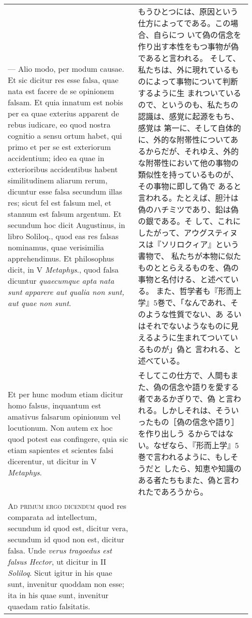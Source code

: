 \documentclass[paper=a4paper,fontsize=10pt,jafontsize=9pt,titlepage]{jlreq}
\begin{document}
\begin{longtable}{p{21em}p{21em}}
\\



--- Alio modo, per modum causae. Et sic dicitur res esse
falsa, quae nata est facere de se opinionem falsam. Et quia innatum est
nobis per ea quae exterius apparent de rebus iudicare, eo quod nostra
cognitio a sensu ortum habet, qui primo et per se est exteriorum
accidentium; ideo ea quae in exterioribus accidentibus habent
similitudinem aliarum rerum, dicuntur esse falsa secundum illas res;
sicut fel est falsum mel, et stannum est falsum argentum. Et secundum
hoc dicit Augustinus, in libro Soliloq., quod eas res falsas nominamus,
quae verisimilia apprehendimus. Et philosophus dicit, in V {\itshape
Metaphys}., quod falsa dicuntur {\itshape quaecumque apta nata sunt
apparere aut qualia non sunt, aut quae non sunt}. 

&

もうひとつには、原因という仕方によってである。この場合、自らにつ
 いて偽の信念を作り出す本性をもつ事物が偽であると言われる。
そして、私たちは、外に現れているものによって事物について判断するように生
 まれついているので、というのも、私たちの認識は、感覚に起源をもち、感覚は
 第一に、そして自体的に、外的な附帯性についてあるからだが、それゆえ、外的
 な附帯性において他の事物の類似性を持っているものが、その事物に即して偽で
 あると言われる。たとえば、胆汁は偽のハチミツであり、鉛は偽の銀である。そ
 して、これにしたがって、アウグスティヌスは『ソリロクィア』という書物で、
 私たちが本物に似たものととらえるものを、偽の事物と名付ける、と述べている。
 また、哲学者も『形而上学』5巻で、「なんであれ、そのような性質でない、あ
 るいはそれでないようなものに見えるように生まれてついているものが」偽と
 言われる、と述べている。

\\

Et per hunc modum
etiam dicitur homo falsus, inquantum est amativus falsarum opinionum vel
locutionum. Non autem ex hoc quod potest eas confingere, quia sic etiam
sapientes et scientes falsi dicerentur, ut dicitur in V {\itshape
Metaphys}.

&
そしてこの仕方で、人間もまた、偽の信念や語りを愛する者であるかぎりで、偽
 と言われる。しかしそれは、そういったもの［偽の信念や語り］を作り出しう
 るからではない。なぜなら、『形而上学』5巻で言われるように、もしそうだと
 したら、知恵や知識のある者たちもまた、偽と言われたであろうから。

\\


{\scshape Ad primum ergo dicendum} quod res comparata ad intellectum,
secundum id quod est, dicitur vera, secundum id quod non est, dicitur
falsa. Unde {\itshape verus tragoedus est falsus Hector}, ut dicitur in
II {\itshape Soliloq}. Sicut igitur in his quae sunt, invenitur quoddam
non esse; ita in his quae sunt, invenitur quaedam ratio falsitatis.


\end{longtable}
\end{document}
